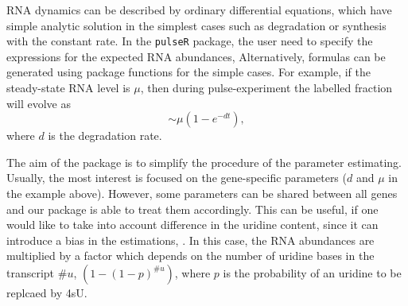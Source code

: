 RNA dynamics can be described by ordinary differential equations,
which have simple analytic solution 
in the simplest cases such as degradation or synthesis with 
the constant rate. In the \verb|pulseR| package,
the user need to specify the expressions for the expected RNA abundances,
Alternatively, formulas can be generated using package functions for the 
simple cases. For example, if the steady-state RNA level is $\mu$, then
during pulse-experiment the labelled fraction will evolve as
\begin{equation}
 [\text{Labelled}] \sim \mu (1 - e^{-dt}),
\end{equation}
where $d$ is the degradation rate.
\par The aim of the package is to simplify the procedure of the parameter estimating.
Usually, the most interest is focused on the gene-specific parameters ($d$ and $\mu$
in the example above). However, some parameters can be shared between all genes and
our package is able to treat them accordingly. This can be useful, if 
one would like to take into account difference in the uridine content, since
it can introduce a bias in the estimations, \citep{miller2011dynamic,
schwalb2012measurement}. In this case, the RNA abundances are multiplied by 
a factor which depends on the number of uridine bases in the transcript $\#u$,
$(1 − (1 − p)^{\#u})$, where $p$ is the probability of an uridine to be replcaed
by 4sU.

